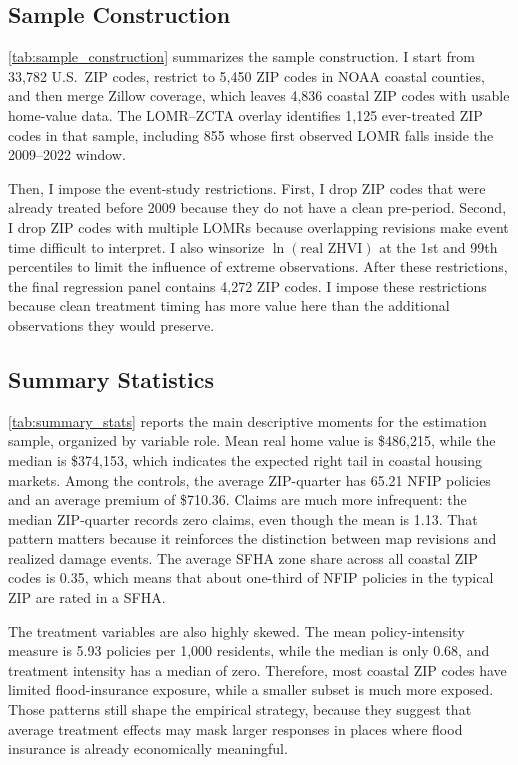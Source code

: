 \documentclass[12pt]{article}
\begin{document}
\subsection{Sample Construction}\label{sec:data_sample}

\autoref{tab:sample_construction} summarizes the sample construction. I start from 33,782 U.S.\ ZIP codes, restrict to 5,450 ZIP codes in NOAA coastal counties, and then merge Zillow coverage, which leaves 4,836 coastal ZIP codes with usable home-value data. The LOMR--ZCTA overlay identifies 1,125 ever-treated ZIP codes in that sample, including 855 whose first observed LOMR falls inside the 2009--2022 window.

Then, I impose the event-study restrictions. First, I drop ZIP codes that were already treated before 2009 because they do not have a clean pre-period. Second, I drop ZIP codes with multiple LOMRs because overlapping revisions make event time difficult to interpret. I also winsorize $\ln(\text{real ZHVI})$ at the 1st and 99th percentiles to limit the influence of extreme observations. After these restrictions, the final regression panel contains 4,272 ZIP codes. I impose these restrictions because clean treatment timing has more value here than the additional observations they would preserve.



\subsection{Summary Statistics}\label{sec:data_sumstats}

\autoref{tab:summary_stats} reports the main descriptive moments for the estimation sample, organized by variable role. Mean real home value is \$486,215, while the median is \$374,153, which indicates the expected right tail in coastal housing markets. Among the controls, the average ZIP-quarter has 65.21 NFIP policies and an average premium of \$710.36. Claims are much more infrequent: the median ZIP-quarter records zero claims, even though the mean is 1.13. That pattern matters because it reinforces the distinction between map revisions and realized damage events. The average SFHA zone share across all coastal ZIP codes is 0.35, which means that about one-third of NFIP policies in the typical ZIP are rated in a SFHA.

The treatment variables are also highly skewed. The mean policy-intensity measure is 5.93 policies per 1,000 residents, while the median is only 0.68, and treatment intensity has a median of zero. Therefore, most coastal ZIP codes have limited flood-insurance exposure, while a smaller subset is much more exposed. Those patterns still shape the empirical strategy, because they suggest that average treatment effects may mask larger responses in places where flood insurance is already economically meaningful.
\end{document}
